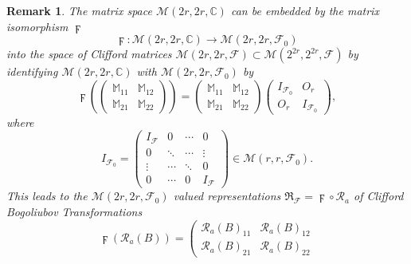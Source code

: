 \documentclass[aps,preprint]{revtex4}
\newtheorem{remark}[theorem]{Remark}
\begin{document}
\begin{remark}
The matrix space $\mathcal{M}\left( 2r,2r,\mathbb{C}\right) $ can be
embedded by the matrix isomorphism $\digamma $ 
\begin{equation}
\digamma :\mathcal{M}\left( 2r,2r,\mathbb{C}\right) \rightarrow \mathcal{M}%
\left( 2r,2r,\mathcal{F}_{0}\right)
\end{equation}%
into the space of Clifford matrices $\mathcal{M}\left( 2r,2r,\mathcal{F}%
\right) \subset \mathcal{M}\left( 2^{2r},2^{2r},\mathcal{F}\right) $ by
identifying $\mathcal{M}\left( 2r,2r,\mathbb{C}\right) $ with $\mathcal{M}%
\left( 2r,2r,\mathcal{F}_{0}\right) $ by%
\begin{equation}
\digamma \left( \left( 
\begin{array}{cc}
\mathbb{M}_{11} & \mathbb{M}_{12} \\ 
\mathbb{M}_{21} & \mathbb{M}_{22}%
\end{array}%
\right) \right) =\left( 
\begin{array}{cc}
\mathbb{M}_{11} & \mathbb{M}_{12} \\ 
\mathbb{M}_{21} & \mathbb{M}_{22}%
\end{array}%
\right) \left( 
\begin{array}{cc}
I_{\mathcal{F}_{0}} & O_{r} \\ 
O_{r} & I_{\mathcal{F}_{0}}%
\end{array}%
\right) ,
\end{equation}%
where 
\begin{equation}
I_{\mathcal{F}_{0}}=\left( 
\begin{array}{cccc}
I_{\mathcal{F}} & 0 & \cdots & 0 \\ 
0 & \ddots & \cdots & \vdots \\ 
\vdots & \cdots & \ddots & 0 \\ 
0 & \cdots & 0 & I_{\mathcal{F}}%
\end{array}%
\right) \in \mathcal{M}\left( r,r,\mathcal{F}_{0}\right) .
\end{equation}%
This leads to the $\mathcal{M}\left( 2r,2r,\mathcal{F}_{0}\right) $ valued
representations $\mathfrak{R}_{\mathcal{F}}=\digamma \circ \mathcal{R}_{a}$
of Clifford Bogoliubov Transformations 
\begin{equation}
\digamma \left( \mathcal{R}_{a}\left( B\right) \right) =\left( 
\begin{array}{cc}
\mathcal{R}_{a}\left( B\right) _{11} & \mathcal{R}_{a}\left( B\right) _{12}
\\ 
\mathcal{R}_{a}\left( B\right) _{21} & \mathcal{R}_{a}\left( B\right) _{22}%

\end{array}
\end{equation}
\end{remark}
\end{document}
